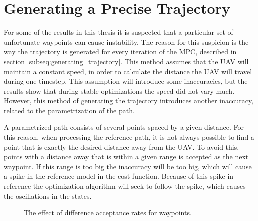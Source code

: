 \section{Generating a Precise Trajectory}

For some of the results in this thesis it is suspected that a particular set of unfortunate waypoints can cause instability. The reason for this suspicion is the way the trajectory is generated for every iteration of the MPC, described in section \ref{subseq:generating_trajectory}. This method assumes that the UAV will maintain a constant speed, in order to calculate the distance the UAV will travel during one timestep. This assumption will introduce some inaccuracies, but the results show that during stable optimizations the speed did not vary much. However, this method of generating the trajectory introduces another inaccuracy, related to the parametrization of the path.

A parametrized path consists of several points spaced by a given distance. For this reason, when processing the reference path, it is not always possible to find a point that is exactly the desired distance away from the UAV. To avoid this, points with a distance away that is within a given range is accepted as the next waypoint. If this range is too big the inaccuracy will be too big, which will cause a spike in the reference model in the cost function. Because of this spike in reference the optimization algorithm will seek to follow the spike, which causes the oscillations in the states.

\begin{figure}[]
	\centering
	\caption{The effect of difference acceptance rates for waypoints.}
	\label{fig:oscillating_attitude}
\end{figure}


